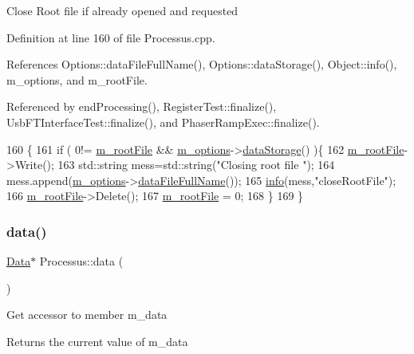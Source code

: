 Close Root file if already opened and requested 

Definition at line 160 of file Processus.\+cpp.



References Options\+::data\+File\+Full\+Name(), Options\+::data\+Storage(), Object\+::info(), m\+\_\+options, and m\+\_\+root\+File.



Referenced by end\+Processing(), Register\+Test\+::finalize(), Usb\+F\+T\+Interface\+Test\+::finalize(), and Phaser\+Ramp\+Exec\+::finalize().


\begin{DoxyCode}
160                                 \{
161   \textcolor{keywordflow}{if} ( 0!= \hyperlink{classProcessus_a76114f8cf2111e910c323a7ae05a015d}{m\_rootFile} && \hyperlink{classProcessus_a74205f3c1e00c4448f7b3257c2351797}{m\_options}->\hyperlink{classOptions_aed7799d10139fa542055b982cb820192}{dataStorage}() )\{
162     \hyperlink{classProcessus_a76114f8cf2111e910c323a7ae05a015d}{m\_rootFile}->Write();
163         std::string mess=std::string(\textcolor{stringliteral}{"Closing root file "});
164         mess.append(\hyperlink{classProcessus_a74205f3c1e00c4448f7b3257c2351797}{m\_options}->\hyperlink{classOptions_ab1cd9f237e9c18fd72323c74565453f8}{dataFileFullName}());
165         \hyperlink{classObject_a644fd329ea4cb85f54fa6846484b84a8}{info}(mess,\textcolor{stringliteral}{"closeRootFile"});
166     \hyperlink{classProcessus_a76114f8cf2111e910c323a7ae05a015d}{m\_rootFile}->Delete();
167     \hyperlink{classProcessus_a76114f8cf2111e910c323a7ae05a015d}{m\_rootFile} = 0;
168   \}
169 \}
\end{DoxyCode}
\mbox{\label{classProcessus_a16e45f329fbce935aeef0ff3cb508228}} 
\subsubsection{\texorpdfstring{data()}{data()}\hspace{0.1cm}{\footnotesize\ttfamily [1/3]}}
{\footnotesize\ttfamily \hyperlink{classData}{Data}$\ast$ Processus\+::data (\begin{DoxyParamCaption}{ }\end{DoxyParamCaption})\hspace{0.3cm}{\ttfamily [inline]}}

Get accessor to member m\+\_\+data \begin{DoxyReturn}{Returns}
the current value of m\+\_\+data 
\end{DoxyReturn}


